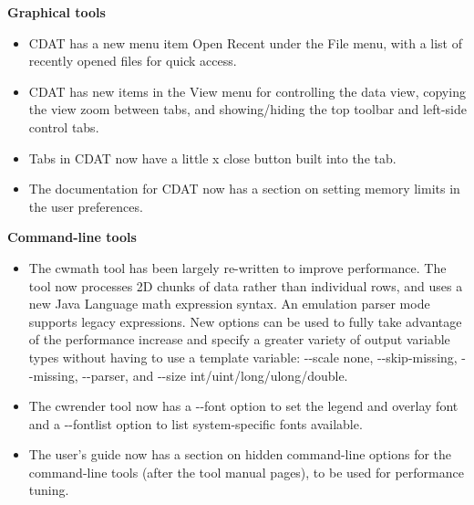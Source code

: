 \hspace{0.4cm} {\bf Graphical tools}
\begin{itemize}

  \item CDAT has a new menu item {\gui Open Recent} under the {\gui File} menu,
  with a list of recently opened files for quick access.

  \item CDAT has new items in the {\gui View} menu for controlling the data
  view, copying the view zoom between tabs, and showing/hiding the top toolbar
  and left-side control tabs.

  \item Tabs in CDAT now have a little x close button built into the tab.

  \item The documentation for CDAT now has a section on setting memory limits
  in the user preferences.

\end{itemize}

\hspace{0.4cm} {\bf Command-line tools}
\begin{itemize}

  \item The cwmath tool has been largely re-written to improve performance.
  The tool now processes 2D chunks of data rather than individual rows, and
  uses a new Java Language math expression syntax.  An emulation parser mode
  supports legacy expressions.  New options can be used to fully take advantage
  of the performance increase and specify a greater variety of output variable
  types without having to use a template variable: -{-}scale none,
  -{-}skip-missing, -{-}missing, -{-}parser, and -{-}size int/uint/long/ulong/double.

  \item The cwrender tool now has a -{-}font option to set the legend and overlay
  font and a -{-}fontlist option to list system-specific fonts available.

  \item The user's guide now has a section on hidden command-line options for
  the command-line tools (after the tool manual pages), to be used for
  performance tuning.

\end{itemize}

